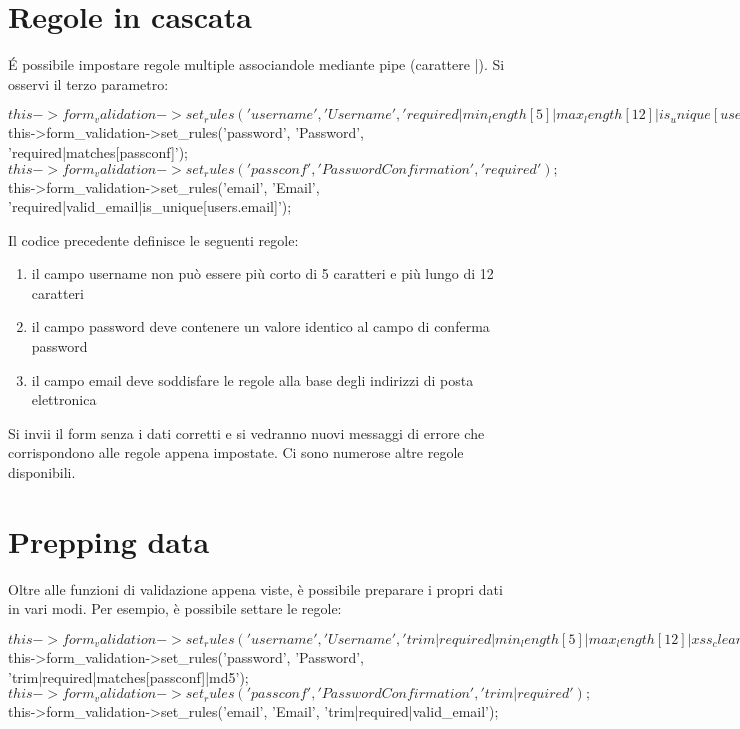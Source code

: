 \section*{Regole in cascata}
\'E possibile impostare regole multiple associandole mediante pipe (carattere |). Si osservi il terzo parametro:

\begin{code}
$this->form_validation->set_rules('username', 'Username', 'required|min_length[5]|max_length[12]|is_unique[users.username]');
$this->form_validation->set_rules('password', 'Password', 'required|matches[passconf]');
$this->form_validation->set_rules('passconf', 'Password Confirmation', 'required');
$this->form_validation->set_rules('email', 'Email', 'required|valid_email|is_unique[users.email]');
\end{code}

Il codice precedente definisce le seguenti regole:

\begin{enumerate}
\item il campo username non può essere più corto di 5 caratteri e più lungo di 12 caratteri
\item il campo password deve contenere un valore identico al campo di conferma password
\item il campo email deve soddisfare le regole alla base degli indirizzi di posta elettronica
\end{enumerate}

Si invii il form senza i dati corretti e si vedranno nuovi messaggi di errore che corrispondono alle regole appena impostate. Ci sono numerose altre regole disponibili.

\section*{Prepping data}
Oltre alle funzioni di validazione appena viste, è possibile preparare i propri dati in vari modi. Per esempio, è possibile settare le regole:

\begin{code}
$this->form_validation->set_rules('username', 'Username', 'trim|required|min_length[5]|max_length[12]|xss_clean');
$this->form_validation->set_rules('password', 'Password', 'trim|required|matches[passconf]|md5');
$this->form_validation->set_rules('passconf', 'Password Confirmation', 'trim|required');
$this->form_validation->set_rules('email', 'Email', 'trim|required|valid_email');
\end{code}


